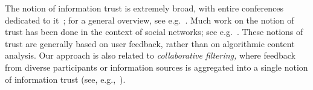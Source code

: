 The notion of information trust is extremely broad, with entire
conferences dedicated to it~\cite{itrust}; for a general overview, see
e.g.~\cite{Grandison00}.
Much work on the notion of trust has been done in the context of
social networks; see
e.g.~\cite{Dellarocas03,Kamvar03,Guha04,Golbeck05}.
These notions of trust are generally based on user feedback, rather
than on algorithmic content analysis.
Our approach is also related to {\em collaborative filtering,} where
feedback from diverse participants or information sources is
aggregated into a single notion of information trust
(see, e.g.,~\cite{Tapestry,Filtering95,Upendra95,Breeseetal-UAI98}).

